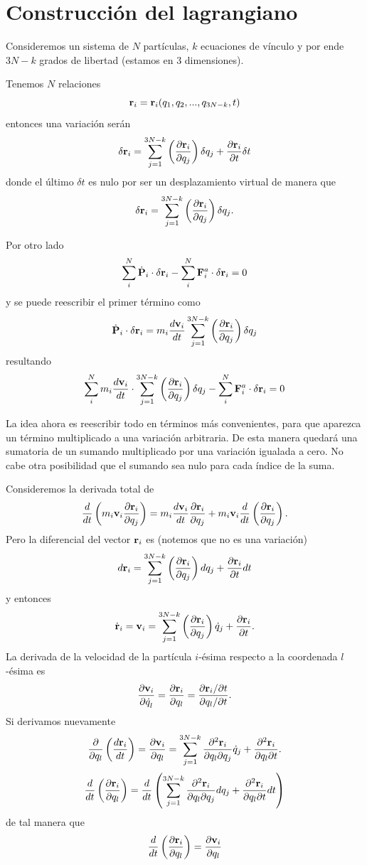 \documentclass[10pt,oneside]{CBFT_book}
\begin{document}
\section{Construcción del lagrangiano}

Consideremos un sistema de $N$ partículas, $k$ ecuaciones de vínculo y por ende $3N - k$ grados de libertad
(estamos en 3 dimensiones).

Tenemos $N$ relaciones
\[
	\vb{r}_i = \vb{r}_i(q_1,q_2,...,q_{3N-k},t)
\]
entonces una variación serán
\[
	\delta \vb{r}_i =  \sum_{j=1}^{3N-k} \left( \dpar{\vb{r}_i}{q_j} \right) \delta q_j + 
	\dpar{\vb{r}_i}{t}\delta t
\]
donde el último $\delta t$ es nulo por ser un desplazamiento virtual de manera que
\[
	\delta \vb{r}_i =  \sum_{j=1}^{3N-k} \left( \dpar{\vb{r}_i}{q_j} \right) \delta q_j.
\]

Por otro lado
\[
	\sum_i^N \dot{\vb{P}}_i \cdot \delta \vb{r}_i - \sum_i^N  \vb{F}_i^a \cdot \delta \vb{r}_i = 0
\]
y se puede reescribir el primer término como
\[
	\dot{\vb{P}}_i \cdot \delta \vb{r}_i = m_i \dtot{\vb{v}_i}{t}\sum_{j=1}^{3N-k} 
	\left( \dpar{\vb{r}_i}{q_j} \right) \delta q_j
\]
resultando
\[
	\sum_i^N m_i \dtot{\vb{v}_i}{t} \cdot \sum_{j=1}^{3N-k} \left( \dpar{\vb{r}_i}{q_j} \right)
	\delta q_j - \sum_i^N  \vb{F}_i^a \cdot \delta \vb{r}_i = 0
\]

La idea ahora es reescribir todo en términos más convenientes, para que aparezca un término multiplicado
a una variación arbitraria. De esta manera quedará una sumatoria de un sumando multiplicado por una
variación igualada a cero. No cabe otra posibilidad que el sumando sea nulo para cada índice de la suma.

Consideremos la derivada total de 
\[
	\frac{d}{dt}\left( m_i\vb{v}_i\dpar{\vb{r}_i}{q_j} \right) =
	m_i \dtot{\vb{v}_i}{t}\dpar{\vb{r}_i}{q_j} + m_i \vb{v}_i \frac{d}{dt}\left(\dpar{\vb{r}_i}{q_j}\right).
\]
Pero la diferencial del vector $\vb{r}_i$ es (notemos que no es una variación)
\[
	d\vb{r}_i = \sum_{j=1}^{3N-k} \left( \dpar{\vb{r}_i}{q_j} \right) dq_j + \dpar{\vb{r}_i}{t} dt
\]
y entonces
\[
	\dot{\vb{r}}_i = \vb{v}_i = \sum_{j=1}^{3N-k} \left( \dpar{\vb{r}_i}{q_j} \right)
	\dot{q}_j + \dpar{\vb{r}_i}{t}.
\]
La derivada de la velocidad de la partícula $i$-ésima respecto a la coordenada $l$-ésima es
\[
	\dpar{\vb{v}_i}{\dot{q}_l} = \dpar{\vb{r}_i}{q_l} =
	\frac{\partial \vb{r}_i/\partial t}{\partial q_l/\partial t}.
\]
Si derivamos nuevamente
\[
	\frac{\partial}{\partial q_l} \left( \dtot{\vb{r}_i}{t} \right) =
	\dpar{\vb{v}_i}{q_l} = \sum_{j=1}^{3N-k} \dparcru{\vb{r}_i}{q_j}{q_l} \dot{q}_j + 
	\dparcru{\vb{r}_i}{t}{q_l}.
\]
\[
	\frac{d}{dt} \left( \dpar{\vb{r}_i}{q_l} \right) = 
	\frac{d}{dt} \left( \sum_{j=1}^{3N-k} \dparcru{\vb{r}_i}{q_j}{q_l} dq_j +
	\dparcru{\vb{r}_i}{t}{q_l} dt \right) 
\]
de tal manera que 
\[
	\frac{d}{dt} \left( \dpar{\vb{r}_i}{q_l} \right) = \dpar{\vb{v}_i}{q_l}
\]
\end{document}
